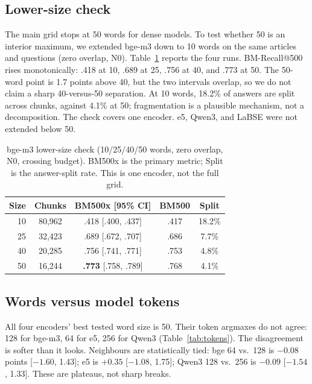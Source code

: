\documentclass[11pt]{article}
\newcommand{\bb}[1]{\textbf{#1}}
\begin{document}
\subsection{Lower-size check}
\label{sec:lower}

The main grid stops at 50 words for dense models. To test whether 50 is an interior maximum, we
extended bge-m3 down to 10 words on the same articles and questions (zero overlap, N0).
Table~\ref{tab:lower} reports the four runs. BM-Recall@500 rises monotonically: .418 at 10, .689 at
25, .756 at 40, and .773 at 50. The 50-word point is 1.7 points above 40, but the two intervals
overlap, so we do not claim a sharp 40-versus-50 separation. At 10 words, 18.2\% of answers are split
across chunks, against 4.1\% at 50; fragmentation is a plausible mechanism, not a decomposition.
The check
covers one encoder. e5, Qwen3, and LaBSE were not extended below 50.

\begin{table}[t]
\centering
\small
\setlength{\tabcolsep}{4pt}
\begin{tabular}{rcccc}
\toprule
Size & Chunks & BM500x [95\% CI] & BM500 & Split \\
\midrule
10 & 80{,}962 & .418 [.400, .437] & .417 & 18.2\% \\
25 & 32{,}423 & .689 [.672, .707] & .686 & 7.7\% \\
40 & 20{,}285 & .756 [.741, .771] & .753 & 4.8\% \\
50 & 16{,}244 & \bb{.773} [.758, .789] & .768 & 4.1\% \\
\bottomrule
\end{tabular}
\caption{bge-m3 lower-size check (10/25/40/50 words, zero overlap, N0, crossing budget). BM500x is
the primary metric; Split is the answer-split rate. This is one encoder, not the full grid.}
\label{tab:lower}
\end{table}

\subsection{Words versus model tokens}
\label{sec:unit}

All four encoders' best tested word size is 50. Their token argmaxes do not agree: 128 for bge-m3,
64 for e5, 256 for Qwen3 (Table~\ref{tab:tokens}). The disagreement is softer than it looks. Neighbours are
statistically tied: bge 64 vs.\ 128 is $-0.08$ points [$-1.60$, 1.43]; e5 is $+0.35$ [$-1.08$,
1.75]; Qwen3 128 vs.\ 256 is $-0.09$ [$-1.54$, 1.33]. These are plateaus, not sharp breaks.
\end{document}
